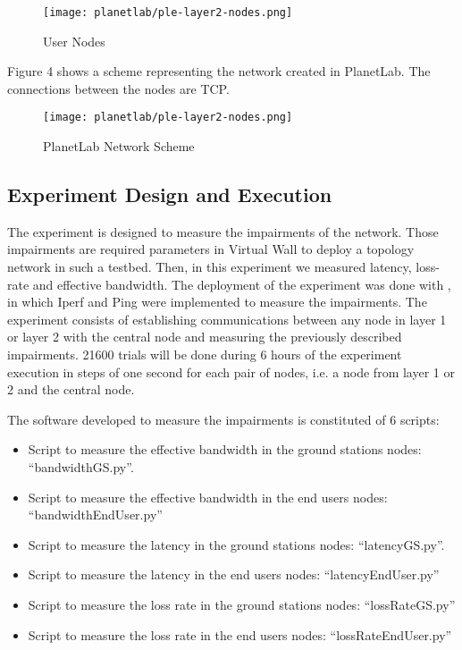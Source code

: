 \begin{figure}[!h]
\begin{center}
\texttt{[image: planetlab/ple-layer2-nodes.png]}

\caption{User Nodes}
\label{fig:ple-layer2-nodes}
\end{center}
\end{figure}
Figure 4 shows a scheme representing the network created in PlanetLab. The
connections between the nodes are TCP.

\begin{figure}[!h]
\begin{center}
\texttt{[image: planetlab/ple-layer2-nodes.png]}

\caption{PlanetLab Network Scheme}
\label{fig:network-scheme}
\end{center}
\end{figure}

\subsection{Experiment Design and Execution}

The experiment is designed to measure the impairments of the network. Those impairments are required parameters in Virtual Wall to deploy a topology network in such a testbed. Then, in this experiment we measured latency, loss-rate and effective bandwidth. The deployment of the experiment was done with \nepi, in which Iperf and Ping were implemented to measure the impairments. The experiment consists of establishing communications between any node in layer 1 or layer 2 with the central node and measuring the previously described impairments. 21600 trials will be done during 6 hours of the experiment execution in steps of one second for each pair of nodes, i.e. a node from layer 1 or 2 and the central node.

The software developed to measure the impairments is constituted of 6 scripts:
\begin{itemize}
\item Script to measure the effective bandwidth in the ground stations nodes: “bandwidthGS.py”. 
\item Script to measure the effective bandwidth in the end users nodes: “bandwidthEndUser.py”
\item Script to measure the latency in the ground stations nodes: “latencyGS.py”.
\item Script to measure the latency  in the end users nodes: “latencyEndUser.py”
\item Script to measure the loss rate in the ground stations nodes: “lossRateGS.py”
\item Script to measure the loss rate in the end users nodes:
  “lossRateEndUser.py”

\end{itemize}


